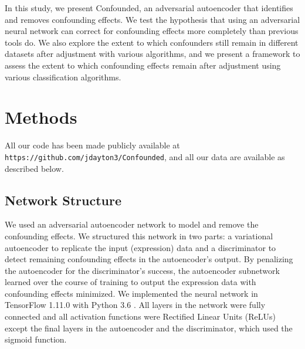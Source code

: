 \documentclass[12pt]{article}
\begin{document}
In this study, we present Confounded, an adversarial autoencoder that identifies and removes confounding effects.
We test the hypothesis that using an adversarial neural network can correct for confounding effects more completely than previous tools do.
We also explore the extent to which confounders still remain in different datasets after adjustment with various algorithms, and we present a framework to assess the extent to which confounding effects remain after adjustment using various classification algorithms.

\section{Methods} \label{sec:methods}

All our code has been made publicly available at \nolinkurl{https://github.com/jdayton3/Confounded}, and all our data are available as described below.

\subsection{Network Structure}

We used an adversarial autoencoder network to model and remove the confounding effects.
We structured this network in two parts: a variational autoencoder \cite{louizos_variational_2015} to replicate the input (expression) data and a discriminator to detect remaining confounding effects in the autoencoder's output.
By penalizing the autoencoder for the discriminator's success, the autoencoder subnetwork learned over the course of training to output the expression data with confounding effects minimized.
We implemented the neural network in TensorFlow 1.11.0 \cite{abadi_tensorflow_2015} with Python 3.6 \cite{python_software_foundation_python_2019}.
All layers in the network were fully connected and all activation functions were Rectified Linear Units (ReLUs) \cite{agarap_deep_2018} except the final layers in the autoencoder and the discriminator, which used the sigmoid function.
\end{document}
